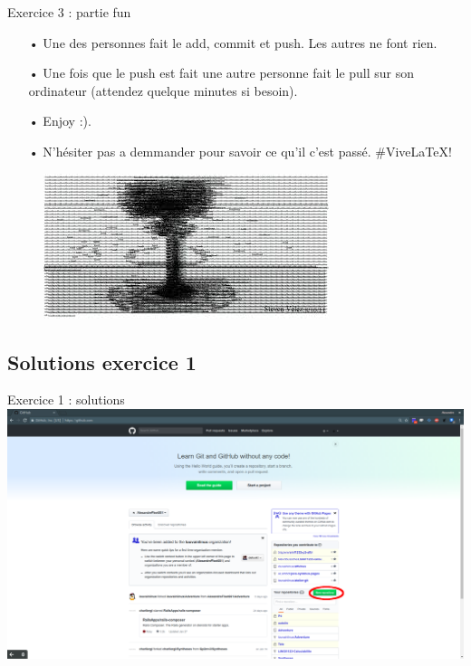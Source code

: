 \documentclass{beamer}
\begin{document}
\begin{frame}{Exercice 3 : partie fun}
    \begin{itemize}
    \item[•] Une des personnes fait le add, commit et push. Les autres ne font rien.
    \item[•] Une fois que le push est fait une autre personne fait le pull sur son ordinateur (attendez quelque minutes si besoin).
    \item[•] Enjoy :). 
    \item[•] N'hésiter pas a demmander pour savoir ce qu'il c'est passé. \#ViveLaTeX!
    \end{itemize}
    \begin{figure}
    \centering
    \includegraphics[scale=0.5]{img/image_exercices/explosion.jpeg}
    \end{figure}
\end{frame}
\subsection{Solutions exercice 1}
\begin{frame}{Exercice 1 : solutions}
	\centering
    \includegraphics[scale=0.16]{img/image_exercices/repo_creat.png}
\end{frame}
\end{document}

